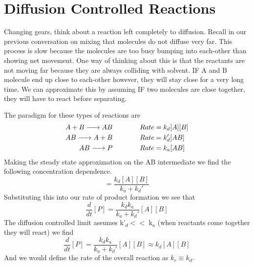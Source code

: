\documentclass{article}
\newcommand{\be}{\begin{equation}}
\newcommand{\ee}{\end{equation}}
\begin{document}
 \section*{Diffusion Controlled Reactions}
 Changing gears, think about a reaction left completely to diffusion.
 Recall in our previous conversation on mixing that molecules do not diffuse very far.
 This process  is slow because the molecules  are too busy bumping into each-other than showing net movement. 
 One way of thinking about this is that the reactants are not moving far because they are always colliding with solvent. 
 IF A and B molecule end up close to each-other however, they will stay close for a very long time. 
 We can approximate this by assuming IF two molecules are close together, they will have to react before separating. 
 
 The paradigm for these types of reactions are
 \be
 \begin{split}
     A + B \ce{->} AB &\qquad \qquad Rate = k_d[A][B]\\
    AB \ce{->} A + B &\qquad \qquad Rate = k_d'[AB]\\
     AB \ce{->} P &\qquad \qquad Rate = k_a[AB]\\
 \end{split}
 \ee
 Making the steady state approximation on the AB intermediate we find the following concentration dependence. 
 \be
 [AB] = \frac{k_d[A][B]}{k_a+k_d'}
 \ee
 Substituting this into our rate of product formation we see that
 \be
 \frac{d}{dt}[P] = \frac{k_dk_a}{k_a+k_d'}[A][B]
 \ee
 The diffusion controlled limit assumes k'$_d <<$ k$_a$ (when reactants come together they will react) we find
 \be
  \frac{d}{dt}[P] = \frac{k_dk_a}{k_a+k_d'}[A][B] \approx k_d[A][B]
 \ee
 And we would define the rate of the overall reaction as $k_r \equiv k_d$. 
 
\end{document}
